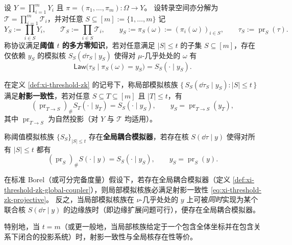 \begin{definition}\label{def:xi-threshold-zk}
设 \(Y=\prod_{i=1}^{m}Y_i\) 且 \(\pi=(\pi_1,\dots,\pi_m):\Omega\to Y\)。
设转录空间亦分解为 \(\mathcal{T}=\prod_{i=1}^{m}\mathcal{T}_i\)，并对任意 \(S\subseteq[m]:=\{1,\dots,m\}\) 记
\[
Y_S:=\prod_{i\in S}Y_i,\qquad
\mathcal{T}_S:=\prod_{i\in S}\mathcal{T}_i,
\qquad
y_S:=\pi_S(\omega):=(\pi_i(\omega))_{i\in S},
\qquad
\tau_S:=\operatorname{pr}_S(\tau).
\]
称协议满足\textbf{阈值 \(t\) 的多方零知识}，若对任意满足 \(|S|\le t\) 的子集 \(S\subseteq[m]\)，存在仅依赖 \(y_S\) 的模拟核
\(
S_S(\dd\tau_S\mid y_S)
\)
使得对 \(\mu\)-几乎处处的 \(\omega\) 有
\[
\mathsf{Law}\bigl(\tau_S\mid \pi_S(\omega)=y_S\bigr)=S_S(\cdot\mid y_S).
\]
\end{definition}

\begin{definition}[局部模拟核族的射影一致性]\label{def:xi-threshold-zk-projective-consistency}
在定义 \ref{def:xi-threshold-zk} 的记号下，称局部模拟核族
\(
\{\,S_S(\dd\tau_S\mid y_S):|S|\le t\,\}
\)
满足\textbf{射影一致性}，若对任意 \(S\subseteq T\subseteq[m]\) 且 \(|T|\le t\)，有
\begin{equation}\label{eq:xi-threshold-zk-projective}
\boxed{\;
(\operatorname{pr}_{T\to S})_{\#}S_T(\cdot\mid y_T)=S_S(\cdot\mid y_S),
\qquad y_S=\operatorname{pr}_{T\to S}(y_T),\;}
\end{equation}
其中 \(\operatorname{pr}_{T\to S}\) 为自然投影（对 \(Y\) 与 \(\mathcal{T}\) 均适用）。
\end{definition}

\begin{definition}[全局可耦合的阈值模拟器]\label{def:xi-threshold-zk-global-coupler}
称阈值模拟核族 \(\{S_S\}_{|S|\le t}\) 存在\textbf{全局耦合模拟器}，若存在核
\(
S(\dd\tau\mid y)
\)
使得对所有 \(|S|\le t\) 都有
\begin{equation}\label{eq:xi-threshold-zk-global-marginals}
\boxed{\;
(\operatorname{pr}_{S})_{\#}S(\cdot\mid y)=S_S(\cdot\mid y_S),
\qquad y_S=\operatorname{pr}_S(y).\;}
\end{equation}
\end{definition}

\begin{proposition}\label{prop:xi-threshold-zk-consistency-coupling}
在标准 Borel（或可分完备度量）假设下，若存在全局耦合模拟器（定义 \ref{def:xi-threshold-zk-global-coupler}），则局部模拟核族必满足射影一致性 \eqref{eq:xi-threshold-zk-projective}。
反之，当局部模拟核族在 \(\nu\)-几乎处处的 \(y\) 上可被\emph{同时}实现为某个联合核 \(S(\dd\tau\mid y)\) 的边缘族时（即边缘扩展问题可行），便存在全局耦合模拟器。
\par
特别地，当 \(t=m\)（或更一般地，当局部核族给定于一个包含全体坐标并在包含关系下闭合的投影系统）时，射影一致性与全局核存在性等价。
\end{proposition}

